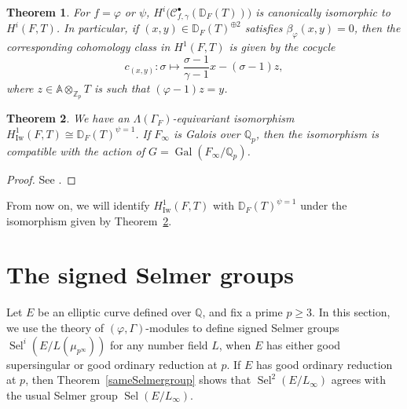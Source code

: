 \documentclass{amsart}
\newcommand{\QQ}{\mathbb Q}
\newcommand{\ZZ}{\mathbb Z}
\newcommand{\DD}{\mathbb D}
\renewcommand{\AA}{\mathbb A}
\DeclareMathOperator{\Sel}{Sel}
\DeclareMathOperator{\Gal}{Gal}
\DeclareMathOperator{\Iw}{Iw}
\newcommand{\Qp}{\QQ_p}
\newcommand{\Zp}{\ZZ_p}
\newcommand{\calC}{\mathcal{C}}
\newcommand{\vp}{\varphi}
\newtheorem{theorem}{Theorem}[section]
\begin{document}
   \begin{theorem}
    For $f=\vp$ or $\psi$, $H^i\big(\calC^\bullet_{f,\gamma}(\DD_F(T))\big)$ is canonically isomorphic to $H^i(F,T)$. In particular, if $(x,y)\in\DD_F(T)^{\oplus 2}$ satisfies $\beta_\vp(x,y)=0$, then the corresponding cohomology class in $H^1(F,T)$ is given by the cocycle
    \[ c_{(x,y)}: \sigma\mapsto \frac{\sigma-1}{\gamma-1}x-(\sigma-1)z,\]
    where $z\in\AA\otimes_{\Zp}T$ is such that $(\vp-1)z=y$.
   \end{theorem}
  
   \begin{theorem}\label{comp}
    We have an $\Lambda(\Gamma_F)$-equivariant isomorphism $H^1_{\Iw}(F,T)\cong\DD_{F}(T)^{\psi=1}$. If $F_\infty$ is Galois over $\Qp$, then the isomorphism is compatible with the action of $G=\Gal(F_\infty\slash \Qp)$.
   \end{theorem}
   \begin{proof}
    See \cite[Th\'eor\`eme II.1.3]{cherbonniercolmez99}.
   \end{proof}

   From now on, we will identify  $H^1_{\Iw}(F,T)$ with $\DD_{F}(T)^{\psi=1}$ under the isomorphism given by Theorem~\ref{comp}.


 \section{The signed Selmer groups}
 
  Let $E$ be an elliptic curve defined over $\QQ$, and fix a prime $p\geq 3$. In this section, we use the theory of $(\vp,\Gamma)$-modules to define signed Selmer groups $\Sel^i(E\slash L(\mu_{p^\infty}))$ for any number field $L$, when $E$ has either good supersingular or good ordinary reduction at $p$. If $E$ has good ordinary reduction at $p$, then Theorem~\ref{sameSelmergroup} shows that $\Sel^2(E\slash L_\infty)$ agrees with the usual Selmer group $\Sel(E\slash L_\infty)$.


  
\end{document}
